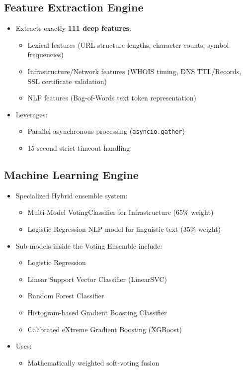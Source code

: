 \subsection{Feature Extraction Engine}

\begin{itemize}
    \item Extracts exactly \textbf{111 deep features}:
    \begin{itemize}
        \item Lexical features (URL structure lengths, character counts, symbol frequencies)
        \item Infrastructure/Network features (WHOIS timing, DNS TTL/Records, SSL certificate validation)
        \item NLP features (Bag-of-Words text token representation)
    \end{itemize}
    \item Leverages:
    \begin{itemize}
        \item Parallel asynchronous processing (\texttt{asyncio.gather})
        \item 15-second strict timeout handling
    \end{itemize}
\end{itemize}

\subsection{Machine Learning Engine}

\begin{itemize}
    \item Specialized Hybrid ensemble system:
    \begin{itemize}
        \item Multi-Model VotingClassifier for Infrastructure (65\% weight)
        \item Logistic Regression NLP model for linguistic text (35\% weight)
    \end{itemize}
    \item Sub-models inside the Voting Ensemble include:
    \begin{itemize}
        \item Logistic Regression
        \item Linear Support Vector Classifier (LinearSVC)
        \item Random Forest Classifier
        \item Histogram-based Gradient Boosting Classifier
        \item Calibrated eXtreme Gradient Boosting (XGBoost) \cite{ref7}
    \end{itemize}
    \item Uses:
    \begin{itemize}
        \item Mathematically weighted soft-voting fusion
    \end{itemize}
\end{itemize}

